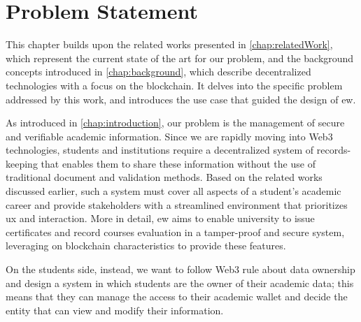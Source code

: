 \chapter{Problem Statement}
\label{chap:problemStatement}
This chapter builds upon the related works presented in \cref{chap:relatedWork}, which represent the current state of the art for our problem, and the background concepts introduced in \cref{chap:background}, which describe decentralized technologies with a focus on the blockchain. It delves into the specific problem addressed by this work, and introduces the use case that guided the design of \gls{ew}.

As introduced in \cref{chap:introduction}, our problem is the management of secure and verifiable academic information. Since we are rapidly moving into Web3 technologies, students and institutions require a decentralized system of records-keeping that enables them to share these information without the use of traditional document and validation methods. Based on the related works discussed earlier, such a system must cover all aspects of a student's academic career and provide stakeholders with a streamlined environment that prioritizes \gls{ux} and interaction. More in detail, \gls{ew} aims to enable university to issue certificates and record courses evaluation in a tamper-proof and secure system, leveraging on blockchain characteristics to provide these features. 

On the students side, instead, we want to follow Web3 rule about data ownership and design a system in which students are the owner of their academic data; this means that they can manage the access to their academic wallet and decide the entity that can view and modify their information.

